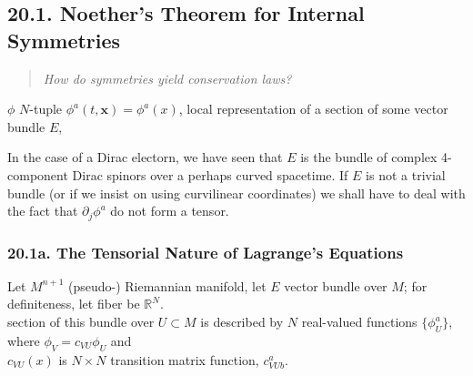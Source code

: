 
\subsection{20.1. Noether's Theorem for Internal Symmetries }

\begin{quote}
\emph{How do symmetries yield conservation laws?}
\end{quote}

$\phi$ $N$-tuple $\phi^a(t,\mathbf{x}) = \phi^a(x)$, local representation of a section of some vector bundle $E$, 



In the case of a Dirac electorn, we have seen that $E$ is the bundle of complex 4-component Dirac spinors over a perhaps curved spacetime. If $E$ is not a trivial bundle (or if we insist on using curvilinear coordinates) we shall have to deal with the fact that $\partial_j \phi^a$ do not form a tensor.  

\subsubsection{ 20.1a. The Tensorial Nature of Lagrange's Equations }

Let $M^{n+1}$ (pseudo-) Riemannian manifold, let $E$ vector bundle over $M$; for definiteness, let fiber be $\mathbb{R}^N$. \\
section of this bundle over $U \subset M$ is described by $N$ real-valued functions $\lbrace \phi^a_U \rbrace$, \\
\quad where $\phi_V = c_{VU}\phi_U$ and \\
\quad \quad $c_{VU}(x)$ is $N\times N$ transition matrix function, $c^a_{VUb}$.   \\

